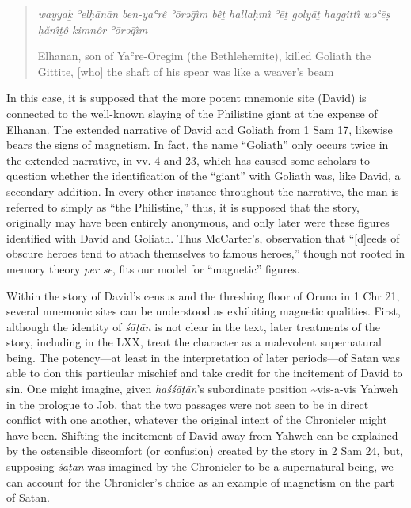 \begin{quote}
\emph{wayyaḵ ʾelḥānān ben-yaʿrê ʾōrəḡı̂m bêṯ hallaḥmı̂ ʾēṯ golyāṯ haggittı̂
wəʿēṣ ḥănı̂ṯô kimnôr ʾōrəḡı̂m}

Elhanan, son of Yaʿre-Oregim (the Bethlehemite), killed Goliath the
Gittite, {[}who{]} the shaft of his spear was like a weaver's beam
\end{quote}

In this case, it is supposed that the more potent mnemonic site (David)
is connected to the well-known slaying of the Philistine giant at the
expense of Elhanan. The extended narrative of David and Goliath from 1
Sam 17, likewise bears the signs of magnetism. In fact, the name
``Goliath'' only occurs twice in the extended narrative, in vv. 4 and
23, which has caused some scholars to question whether the
identification of the ``giant'' with Goliath was, like David, a
secondary addition. In every other instance throughout the narrative,
the man is referred to simply as ``the Philistine,'' thus, it is
supposed that the story, originally may have been entirely anonymous,
and only later were these figures identified with David and
Goliath.\autocites[For a fuller account of the textual issues
surrounding the main narrative about David and Goliath,
see,][280--309]{mccarter1980}[and][69--77]{mckenzie2000} Thus
McCarter's, observation that ``{[}d{]}eeds of obscure heroes tend to
attach themselves to famous heroes,''\autocite[450]{mccarter1984} though
not rooted in memory theory \emph{per se}, fits our model for
``magnetic'' figures.

Within the story of David's census and the threshing floor of Oruna in 1
Chr 21, several mnemonic sites can be understood as exhibiting magnetic
qualities. First, although the identity of \emph{śāṭān} is not clear in
the text, later treatments of the story, including in the LXX, treat the
character as a malevolent supernatural being. The potency---at least in
the interpretation of later periods---of Satan was able to don this
particular mischief and take credit for the incitement of David to sin.
One might imagine, given \emph{haśśāṭān}'s subordinate position
\textasciitilde{}vis-a-vis Yahweh in the prologue to Job, that the two
passages were not seen to be in direct conflict with one another,
whatever the original intent of the Chronicler might have been. Shifting
the incitement of David away from Yahweh can be explained by the
ostensible discomfort (or confusion) created by the story in 2 Sam 24,
but, supposing \emph{śāṭān} was imagined by the Chronicler to be a
supernatural being, we can account for the Chronicler's choice as an
example of magnetism on the part of Satan.


